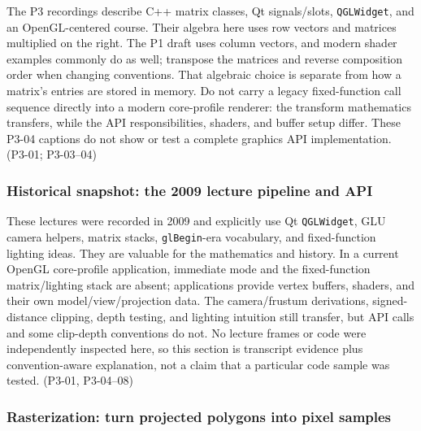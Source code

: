 \hypertarget{03-visual-computing-i-ch018-historical-snapshot-the-2009-lecture-pipeline-and-api}{}

The P3 recordings describe C++ matrix classes, Qt signals/slots, \texttt{QGLWidget}, and an OpenGL-centered course. Their algebra here uses row vectors and matrices multiplied on the right. The P1 draft uses column vectors, and modern shader examples commonly do as well; transpose the matrices and reverse composition order when changing conventions. That algebraic choice is separate from how a matrix's entries are stored in memory. Do not carry a legacy fixed-function call sequence directly into a modern core-profile renderer: the transform mathematics transfers, while the API responsibilities, shaders, and buffer setup differ. These P3-04 captions do not show or test a complete graphics API implementation. (P3-01; P3-03--04)

\subsubsection{Historical snapshot: the 2009 lecture pipeline and API}\label{03-visual-computing-i-ch018-historical-snapshot-the-2009-lecture-pipeline-and-api-1}

\hypertarget{03-visual-computing-i-ch018-historical-snapshot-the-2009-lecture-pipeline-and-api-1}{}

These lectures were recorded in 2009 and explicitly use Qt \texttt{QGLWidget}, GLU camera helpers, matrix stacks, \texttt{glBegin}-era vocabulary, and fixed-function lighting ideas. They are valuable for the mathematics and history. In a current OpenGL core-profile application, immediate mode and the fixed-function matrix/lighting stack are absent; applications provide vertex buffers, shaders, and their own model/view/projection data. The camera/frustum derivations, signed-distance clipping, depth testing, and lighting intuition still transfer, but API calls and some clip-depth conventions do not. No lecture frames or code were independently inspected here, so this section is transcript evidence plus convention-aware explanation, not a claim that a particular code sample was tested. (P3-01, P3-04--08)

\subsubsection{Rasterization: turn projected polygons into pixel samples}\label{03-visual-computing-i-ch018-rasterization-turn-projected-polygons-into-pixel-samples}

